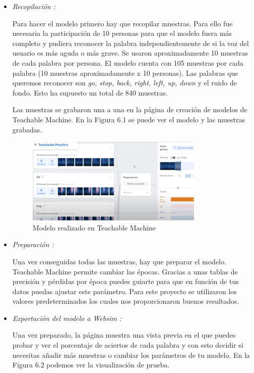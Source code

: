 \begin{itemize}
\item \textit{Recopilación :}

Para hacer el modelo primero hay que recopilar muestras. Para ello fue necesaria la participación de 10 personas para que el modelo fuera más completo y pudiera reconocer la palabra independientemente de si la voz del usuario es más aguda o más grave.  Se usaron aproximadamente 10 muestras de cada palabra por persona. El modelo cuenta con 105 muestras por cada palabra (10 muestras aproximadamente x 10 personas). Las palabras que queremos reconocer son \textit{go, stop, back, right, left, up, down } y el ruido de fondo. Esto ha supuesto un total de 840 muestras.

Las muestras se grabaron una a una en la página de creación de modelos de Teachable Machine. En la Figura 6.1 se puede ver el modelo y las muestras grabadas.


\begin{figure}[H]
 \centering
    \includegraphics[width=0.8\textwidth, height=0.4\textwidth]{chapters/images/teachablemachine.png}
    \caption{Modelo realizado en Teachable Machine}
\end{figure}
 

\item  \textit{Preparación :}

Una vez conseguidas todas las muestras, hay que preparar el modelo. Teachable Machine permite cambiar las épocas. Gracias a unas tablas de precisión y pérdidas por época puedes guiarte para que en función de tus datos puedas ajustar este parámetro. Para este proyecto se utilizaron los valores predeterminados los cuales nos proporcionaron buenos resultados.

\item  \textit{Exportación del modelo a Websim :}

Una vez preparado, la página muestra una vista previa en el que puedes probar y ver el porcentaje de aciertos de cada palabra y con esto decidir si necesitas añadir más muestras o cambiar los parámetros de tu modelo.  En la Figura 6.2 podemos ver la visualización de prueba.


\end{itemize}
